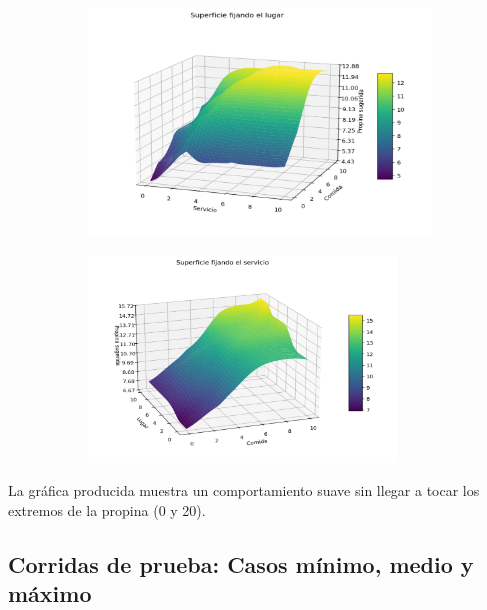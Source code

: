 \documentclass[11pt, letterpaper]{article}
\begin{document}
\begin{figure}[h]
	\centering
	\begin{subfigure}{0.9\textwidth} %
		\centering
		\includegraphics[width=1\textwidth]{IMG/P15.png}
		\label{fig:G1}
	\end{subfigure}
	\hfill
	\begin{subfigure}{0.8\textwidth} %
		\centering
		\includegraphics[width=0.9\textwidth]{IMG/P16.png}
		\label{fig:G2}
	\end{subfigure}
	\label{fig:comparacion1}
\end{figure}

La gráfica producida muestra un comportamiento suave sin llegar a tocar los extremos de la propina (0 y 20).



\newpage

\subsection{Corridas de prueba: Casos mínimo, medio y máximo}
\end{document}
